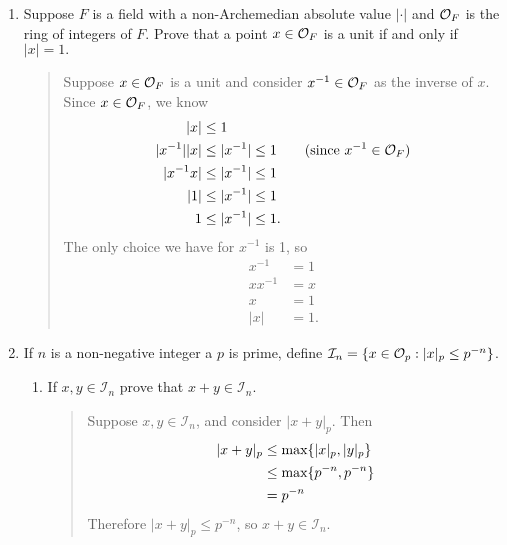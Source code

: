 \documentclass{hw}
\begin{document}
    \begin{enumerate}
        \item Suppose $F$ is a field with a non-Archemedian absolute value $|\cdot|$ and $\mathcal{O}_{F}$ is the ring of
        integers of $F$. Prove that a point $x\in\mathcal{O}_{F}$ is a unit if and only if $|x|=1.$
        \begin{quote}
            Suppose $x\in\mathcal{O}_{F}$ is a unit and consider $x^{-1}\in\mathcal{O}_{F}$ as the inverse of $x$. Since $x\in\mathcal{O}_{F}$, we know
            \begin{align*}
                |x| &\leq 1\\
                |x^{-1}||x| &\leq |x^{-1}|\leq1 \qquad\text{(since $x^{-1}\in\mathcal{O}_{F}$)}\\
                |x^{-1}x| &\leq |x^{-1}|\leq1\\
                |1| &\leq |x^{-1}| \leq1\\
                1 &\leq |x^{-1}| \leq 1.
            \end{align*}
            The only choice we have for $x^{-1}$ is 1, so
            \begin{align*}
                x^{-1} &= 1\\
                xx^{-1}&= x\\
                x&=1\\
                |x|&=1.
            \end{align*}
        \end{quote}

        \item If $n$ is a non-negative integer a $p$ is prime, define $\mathcal{I}_{n}=\{x\in\mathcal{O}_{p}:|x|_{p}\leq p^{-n}\}$.
        \begin{enumerate}
            \item If $x,y\in\mathcal{I}_{n}$ prove that $x+y\in\mathcal{I}_{n}$.
            \begin{quote}
                Suppose $x,y\in\mathcal{I}_{n}$, and consider $|x+y|_{p}$. Then
                \begin{align*}
                    |x+y|_{p} &\leq \text{max}\{ |x|_{p} , |y|_{p} \}\\
                    &\leq \text{max}\{ p^{-n} , p^{-n} \}\\
                    &= p^{-n}
                \end{align*}
                Therefore $|x+y|_{p}\leq p^{-n}$, so $x+y\in\mathcal{I}_{n}$.
            \end{quote}
        \end{enumerate}
    \end{enumerate}
\end{document}
